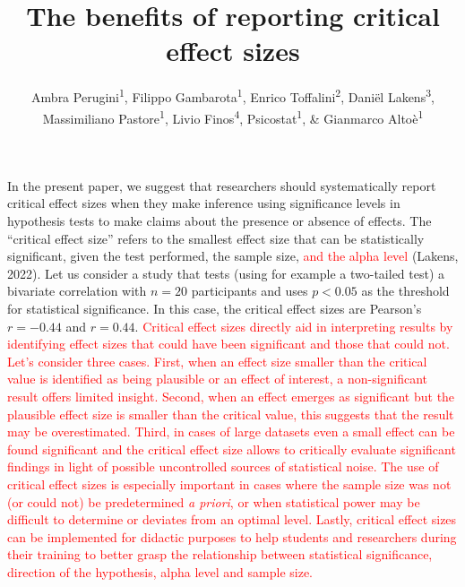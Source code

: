 \documentclass[
  man]{apa7}
\title{The benefits of reporting critical effect sizes}
\author{Ambra Perugini\textsuperscript{1}, Filippo Gambarota\textsuperscript{1}, Enrico Toffalini\textsuperscript{2}, Daniël Lakens\textsuperscript{3}, Massimiliano Pastore\textsuperscript{1}, Livio Finos\textsuperscript{4}, Psicostat\textsuperscript{1}, \& Gianmarco Altoè\textsuperscript{1}}
\date{}
\affiliation{\vspace{0.5cm}\textsuperscript{1} Department of Developmental and Social Psychology, University of Padova, Italy\\\textsuperscript{2} Department of General Psychology, University of Padova, Italy\\\textsuperscript{3} Eindhoven University of Technology, Netherlands\\\textsuperscript{4} Department of Statistics, University of Padova, Italy}
\begin{document}
\maketitle

In the present paper, we suggest that researchers should systematically report critical effect sizes when they make inference using significance levels in hypothesis tests to make claims about the presence or absence of effects. The ``critical effect size'' refers to the smallest effect size that can be statistically significant, given the test performed, the sample size, \textcolor{red}{and the alpha level} (Lakens, 2022). Let us consider a study that tests (using for example a two-tailed test) a bivariate correlation with \(n = 20\) participants and uses \(p < 0.05\) as the threshold for statistical significance. In this case, the critical effect sizes are Pearson's \(r = -0.44\) and \(r = 0.44\). \textcolor{red}{Critical effect sizes directly aid in interpreting results by identifying effect sizes that could have been significant and those that could not. Let's consider three cases. First, when an effect size smaller than the critical value is identified as being plausible or an effect of interest, a non-significant result offers limited insight. Second, when an effect emerges as significant but the plausible effect size is smaller than the critical value, this suggests that the result may be overestimated. Third, in cases of large datasets even a small effect can be found significant and the critical effect size allows to critically evaluate significant findings in light of possible uncontrolled sources of statistical noise. The use of critical effect sizes is especially important in cases where the sample size was not (or could not) be predetermined \textit{a priori}, or when statistical power may be difficult to determine or deviates from an optimal level. Lastly, critical effect sizes can be implemented for didactic purposes to help students and researchers during their training to better grasp the relationship between statistical significance, direction of the hypothesis, alpha level and sample size.}
\end{document}
